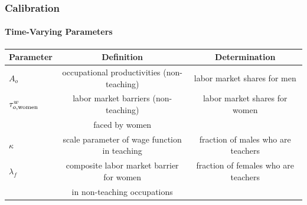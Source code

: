 \documentclass[11pt,hyperref={bookmarks=false},table,aspectratio=169]{beamer}
\begin{document}
\begin{frame}
	\frametitle{Calibration}
	\framesubtitle{Time-Varying Parameters}
	\footnotesize
	\begin{table}[h!]
		\centering
		\begin{tabular}{lcc}
			\toprule
			Parameter & Definition & Determination \\
			\midrule			
			$A_{o}$ & occupational productivities (non-teaching) & labor market shares for men  \\
			$\tau^{w}_{o,{\rm women}}$ & labor market barriers (non-teaching) & labor market shares for women \\
			& faced by women & \\
			$\kappa$ & scale parameter of wage function in teaching & fraction of males who are teachers \\
			$\lambda_f$ & composite labor market barrier for women & fraction of females who are teachers \\
			& in non-teaching occupations & \\
			\bottomrule
		\end{tabular}
		\label{tab:param_time}
	\end{table}
\end{frame}

	



\end{document}
